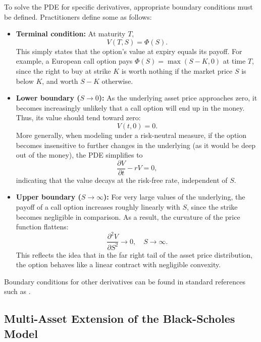 \documentclass[12pt]{report} %
\theoremstyle{plain} %
\theoremstyle{definition} %
\theoremstyle{remark} %
\begin{document}
To solve the PDE for specific derivatives, appropriate boundary conditions must be defined. Practitioners
define some as follows:

\begin{itemize}
 \item \textbf{Terminal condition:} At maturity \(T\),
 \[
 V(T,S)=\Phi(S).
 \]
 This simply states that the option's value at expiry equals its payoff. For example, a European call option pays \(\Phi(S)=\max(S-K,0)\) at time \(T\), since the right to buy at strike \(K\) is worth nothing if the market price \(S\) is below \(K\), and worth \(S-K\) otherwise.

 \item \textbf{Lower boundary (\(S\to 0\)):} As the underlying asset price approaches zero, it becomes increasingly unlikely that a call option will end up in the money. Thus, its value should tend toward zero:
 \[
 V(t,0)=0.
 \]
 More generally, when modeling under a risk-neutral measure, if the option becomes insensitive to further changes in the underlying (as it would be deep out of the money), the PDE simplifies to
 \[
 \frac{\partial V}{\partial t} - rV = 0,
 \]
 indicating that the value decays at the risk-free rate, independent of \(S\).

 \item \textbf{Upper boundary (\(S\to\infty\)):} For very large values of the underlying, the payoff of a call option increases roughly linearly with \(S\), since the strike becomes negligible in comparison. As a result, the curvature of the price function flattens:
 \[
 \frac{\partial^{2} V}{\partial S^{2}} \to 0,\quad S \to \infty.
 \]
 This reflects the idea that in the far right tail of the asset price distribution, the option behaves like a linear contract with negligible convexity.
\end{itemize}

Boundary conditions for other derivatives can be found in standard references such as 
\cite{Wilmott2010PaulWO}.

\subsection{Multi-Asset Extension of the Black-Scholes Model}\label{sec:multiasset}
\end{document}
